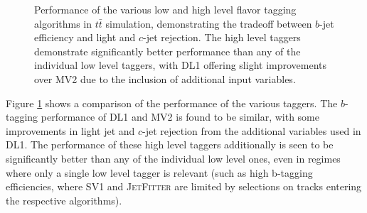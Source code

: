 \begin{figure}[ht]
\centering
{}
\caption{\label{fig:low-vs-high-tag} Performance of the various low and high level flavor tagging algorithms 
in $t\bar{t}$ simulation, demonstrating the tradeoff between $b$-jet efficiency and light and $c$-jet rejection. 
The high level taggers demonstrate significantly better performance than any of the individual low level 
taggers, with DL1 offering slight improvements over MV2 due to the inclusion of additional input variables.}
\end{figure}


Figure \ref{fig:low-vs-high-tag} shows a comparison of the performance of the various taggers. 
The $b$-tagging performance of DL1 and MV2 is found to be similar, with some improvements in 
light jet and $c$-jet rejection from the additional variables used in DL1. 
The performance of these high level taggers additionally is seen to be significantly better than any of the 
individual low level ones, even in regimes where only a single low level tagger is relevant (such as high 
b-tagging efficiencies, where SV1 and \textsc{JetFitter}\xspace are limited by selections on tracks 
entering the respective algorithms).

